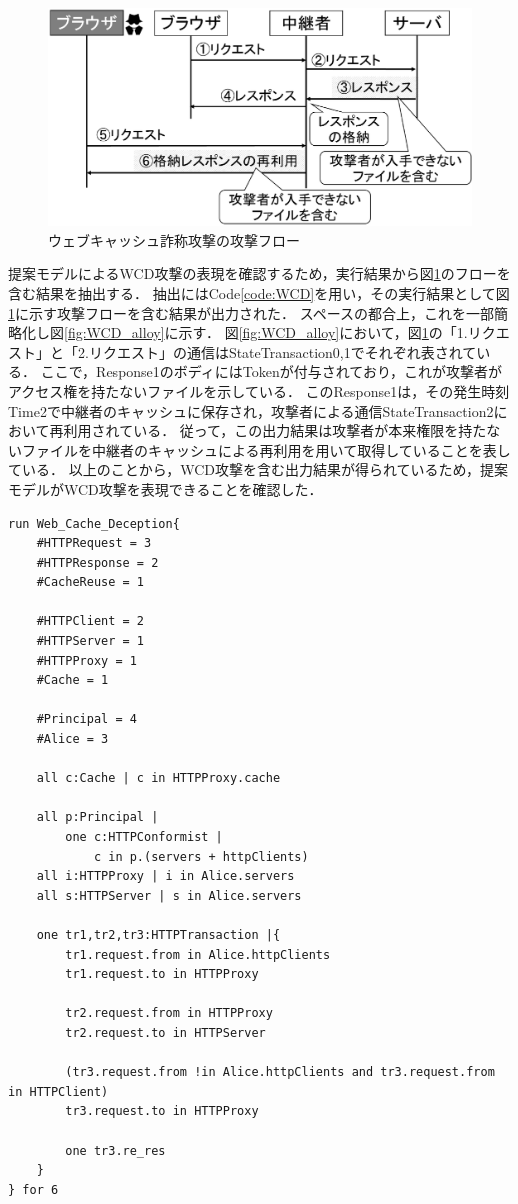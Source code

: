 \documentclass[12pt,a4paper]{jbook}
\begin{document}
\begin{figure}[htb]
\centering
\includegraphics[width=450pt]{./fig/WCD_flow.eps}
\caption{ウェブキャッシュ詐称攻撃の攻撃フロー}
\label{fig:WCD_flow}
\end{figure}

提案モデルによるWCD攻撃の表現を確認するため，実行結果から図\ref{fig:WCD_flow}のフローを含む結果を抽出する．
抽出にはCode\ref{code:WCD}を用い，その実行結果として図\ref{fig:WCD_flow}に示す攻撃フローを含む結果が出力された．
スペースの都合上，これを一部簡略化し図\ref{fig:WCD_alloy}に示す．
図\ref{fig:WCD_alloy}において，図\ref{fig:WCD_flow}の「1.リクエスト」と「2.リクエスト」の通信はStateTransaction0,1でそれぞれ表されている．
ここで，Response1のボディにはTokenが付与されており，これが攻撃者がアクセス権を持たないファイルを示している．
このResponse1は，その発生時刻Time2で中継者のキャッシュに保存され，攻撃者による通信StateTransaction2において再利用されている．
従って，この出力結果は攻撃者が本来権限を持たないファイルを中継者のキャッシュによる再利用を用いて取得していることを表している．
以上のことから，WCD攻撃を含む出力結果が得られているため，提案モデルがWCD攻撃を表現できることを確認した．

\begin{lstlisting}[caption=WCD攻撃の表現, label=code:WCD]
run Web_Cache_Deception{
	#HTTPRequest = 3
	#HTTPResponse = 2
	#CacheReuse = 1

	#HTTPClient = 2
	#HTTPServer = 1
	#HTTPProxy = 1
	#Cache = 1

	#Principal = 4
	#Alice = 3

	all c:Cache | c in HTTPProxy.cache

	all p:Principal |
		one c:HTTPConformist |
			c in p.(servers + httpClients)
	all i:HTTPProxy | i in Alice.servers
	all s:HTTPServer | s in Alice.servers

	one tr1,tr2,tr3:HTTPTransaction |{
		tr1.request.from in Alice.httpClients
		tr1.request.to in HTTPProxy

		tr2.request.from in HTTPProxy
		tr2.request.to in HTTPServer

		(tr3.request.from !in Alice.httpClients and tr3.request.from in HTTPClient)
		tr3.request.to in HTTPProxy

		one tr3.re_res
	}
} for 6
\end{lstlisting}
\end{document}
